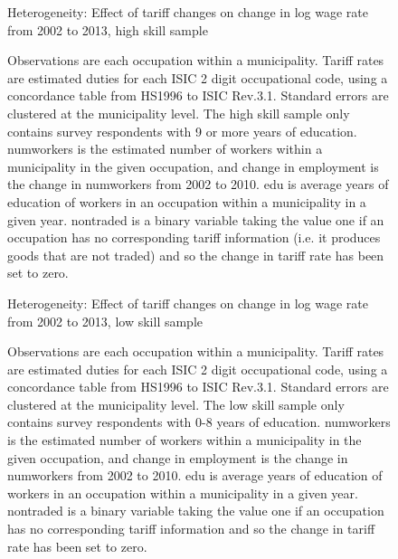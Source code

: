 \begin{landscape}
\begin{figure}[H]
\begin{center}
Heterogeneity: Effect of tariff changes on change in log wage rate from 2002 to 2013, high skill sample

\caption{\label{fig:Table4}}
\end{center}
\scriptsize
Observations are each occupation within a municipality.
Tariff rates are estimated duties for each ISIC 2 digit occupational code,
using a concordance table from HS1996 to ISIC Rev.3.1. Standard errors are clustered at the 
municipality level. The high skill sample only 
contains survey respondents with 9 or more years of education. numworkers is the estimated
number of workers within a municipality in the given occupation, and change in employment
is the change in numworkers from 2002 to 2010. edu is average years of education 
of workers in an occupation within a municipality in a given year. nontraded is a binary variable
taking the value one if an occupation has no corresponding tariff information (i.e. it produces goods
that are not traded) and so the change in
tariff rate has been set to zero.
\end{figure}

\begin{figure}[H]
\begin{center}
Heterogeneity: Effect of tariff changes on change in log wage rate from 2002 to 2013, low skill sample

\caption{\label{fig:Table5}}
\end{center}
\scriptsize
Observations are each occupation within a municipality. 
Tariff rates are estimated duties for each ISIC 2 digit occupational code,
using a concordance table from HS1996 to ISIC Rev.3.1. Standard errors are clustered at the 
municipality level. The low skill sample only 
contains survey respondents with 0-8 years of education. numworkers is the estimated
number of workers within a municipality in the given occupation, and change in employment
is the change in numworkers from 2002 to 2010. edu is average years of education 
of workers in an occupation within a municipality in a given year. nontraded is a binary variable
taking the value one if an occupation has no corresponding tariff information and so the change in
tariff rate has been set to zero.
\end{figure}
\end{landscape}